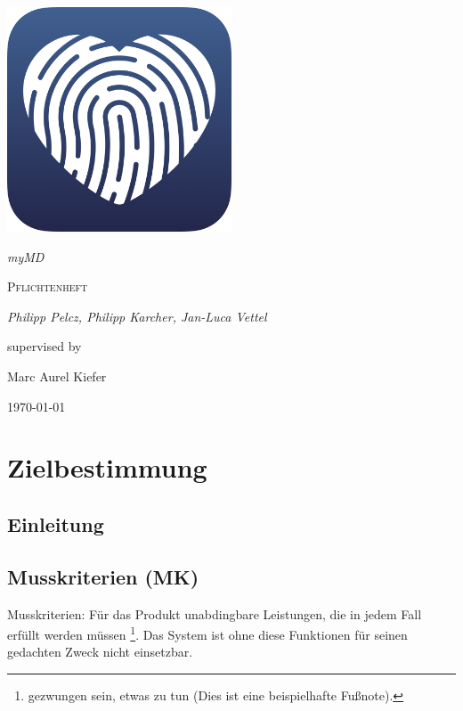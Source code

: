 \documentclass[a4paper]{scrreprt}
\begin{document}
 

\begin{titlepage}
	\centering
	\includegraphics[width=0.5\textwidth]{myMD_Logo}\par\vspace{0.5cm}
	{\itshape\huge myMD \par}
	\vspace{3cm}
	{\scshape\Large Pflichtenheft\par}
	\vspace{3cm}
	{\Large\itshape Philipp Pelcz, Philipp Karcher, Jan-Luca Vettel\par}
	\vfill
	supervised by\par
	Marc Aurel Kiefer

	\vfill

	{\large \today\par}
\end{titlepage}
 

\tableofcontents
 
\chapter{Zielbestimmung}

\section{Einleitung}

 
\section{Musskriterien (MK)}
Musskriterien: Für das Produkt unabdingbare Leistungen, die in jedem Fall
erfüllt werden müssen \footnote{gezwungen sein, etwas zu tun (Dies ist eine
beispielhafte Fußnote).}. Das System ist ohne diese Funktionen für seinen
gedachten Zweck nicht einsetzbar.
 
\end{document}
